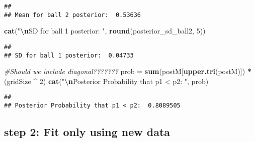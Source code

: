 \documentclass[
]{article}
\newenvironment{Shaded}{\begin{snugshade}}{\end{snugshade}}
\newcommand{\CommentTok}[1]{\textcolor[rgb]{0.56,0.35,0.01}{\textit{#1}}}
\newcommand{\DecValTok}[1]{\textcolor[rgb]{0.00,0.00,0.81}{#1}}
\newcommand{\FunctionTok}[1]{\textcolor[rgb]{0.13,0.29,0.53}{\textbf{#1}}}
\newcommand{\NormalTok}[1]{#1}
\newcommand{\OtherTok}[1]{\textcolor[rgb]{0.56,0.35,0.01}{#1}}
\newcommand{\SpecialCharTok}[1]{\textcolor[rgb]{0.81,0.36,0.00}{\textbf{#1}}}
\newcommand{\StringTok}[1]{\textcolor[rgb]{0.31,0.60,0.02}{#1}}
\begin{document}
\begin{verbatim}
## 
## Mean for ball 2 posterior:  0.53636
\end{verbatim}

\begin{Shaded}
\begin{Highlighting}[]
\FunctionTok{cat}\NormalTok{(}\StringTok{"}\SpecialCharTok{\textbackslash{}n}\StringTok{SD for ball 1 posterior: "}\NormalTok{, }\FunctionTok{round}\NormalTok{(posterior\_sd\_ball2, }\DecValTok{5}\NormalTok{))}
\end{Highlighting}
\end{Shaded}

\begin{verbatim}
## 
## SD for ball 1 posterior:  0.04733
\end{verbatim}

\begin{Shaded}
\begin{Highlighting}[]
\CommentTok{\#Should we include diagonal???????}
\NormalTok{prob }\OtherTok{=} \FunctionTok{sum}\NormalTok{(postM[}\FunctionTok{upper.tri}\NormalTok{(postM)]) }\SpecialCharTok{*}\NormalTok{ (gridSize }\SpecialCharTok{\^{}} \DecValTok{2}\NormalTok{) }
\FunctionTok{cat}\NormalTok{(}\StringTok{"}\SpecialCharTok{\textbackslash{}n}\StringTok{Posterior Probability that p1 \textless{} p2: "}\NormalTok{, prob)}
\end{Highlighting}
\end{Shaded}

\begin{verbatim}
## 
## Posterior Probability that p1 < p2:  0.8089505
\end{verbatim}

\hypertarget{step-2-fit-only-using-new-data}{%
\subsection{step 2: Fit only using new
data}\label{step-2-fit-only-using-new-data}}
\end{document}
